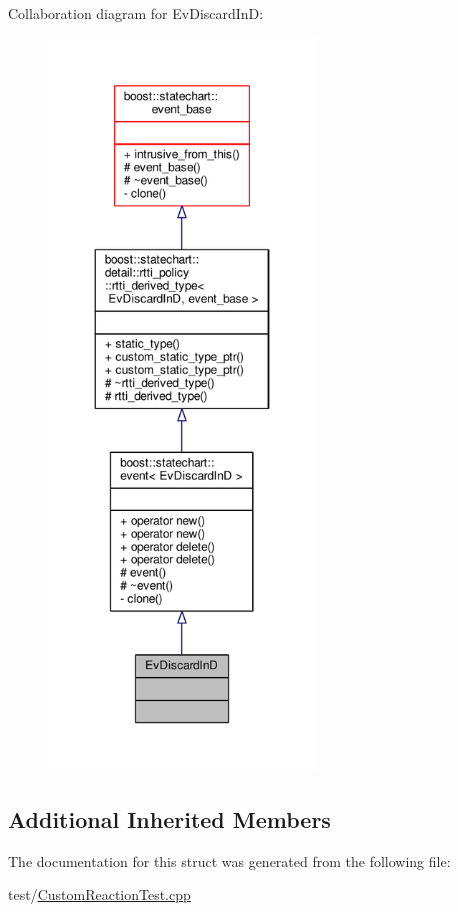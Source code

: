 Collaboration diagram for Ev\+Discard\+InD\+:
\nopagebreak
\begin{figure}[H]
\begin{center}
\leavevmode
\includegraphics[height=550pt]{struct_ev_discard_in_d__coll__graph}
\end{center}
\end{figure}
\subsection*{Additional Inherited Members}


The documentation for this struct was generated from the following file\+:\begin{DoxyCompactItemize}
\item 
test/\mbox{\hyperlink{_custom_reaction_test_8cpp}{Custom\+Reaction\+Test.\+cpp}}\end{DoxyCompactItemize}
